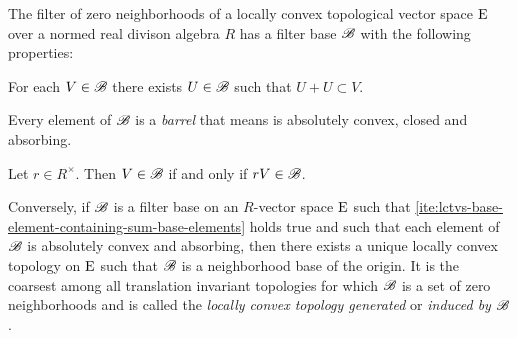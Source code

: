 \begin{propanddef}\label{thm:filter-base-absorbing-absolutely-convex-sets-generating-locally-convex-topology}
  The filter of zero neighborhoods of a locally convex topological vector space $\mathrm{E}$ over a
  normed real divison algebra $R$ has a filter base $\mathscr{B}$ with the following properties:
  \begin{romanlist}
  \item\label{ite:lctvs-base-element-containing-sum-base-elements}
    For each $V \in \mathscr{B}$ there exists $U\in\mathscr{B}$ such that $U+U \subset V$.
  \item\label{ite:lctvs-base-elements-circled-balanced}
    Every element of $\mathscr{B}$ is a \emph{barrel} that means is absolutely convex, closed and absorbing.
  \item\label{ite:lctvs-base-element-containing-shrunk-stretched-base-element}
    Let  $r\in R^\times$. Then $V\in \mathscr{B}$ if and only if $rV \in \mathscr{B}$. 
  \end{romanlist}
  Conversely, if  $\mathscr{B}$ is a filter base on an $R$-vector space $\mathrm{E}$ such that
  \ref{ite:lctvs-base-element-containing-sum-base-elements} holds true and such that each
  element of $\mathscr{B}$ is absolutely convex and absorbing, then there exists a unique locally
  convex topology on $\mathrm{E}$  such that $\mathscr{B}$ is a neighborhood base
  of the origin. It is the coarsest among all translation invariant  topologies
  for which  $\mathscr{B}$ is a set of zero neighborhoods and is called the \emph{locally convex topology generated} or
  \emph{induced by} $\mathscr{B}$.
\end{propanddef}

